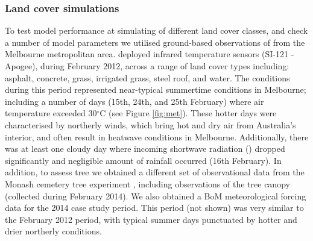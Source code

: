 \documentclass[final,3p,times,authoryear]{elsarticle}
\newcommand{\degreeC}{\ensuremath{^\circ}C }
\begin{document}
\subsubsection{Land cover simulations}\label{sec:landcoversim} 

To test model performance at simulating  of different land cover classes, and check a number of model parameters we utilised ground-based observations of  from the Melbourne metropolitan area. \cite{Coutts2016a} deployed infrared temperature sensors (SI-121 - Apogee), during February 2012, across a range of land cover types including: asphalt, concrete, grass, irrigated grass, steel roof, and water. The conditions during this period represented near-typical summertime conditions in Melbourne; including a number of days (15th, 24th, and 25th February) where air temperature exceeded 30\degreeC (see Figure \ref{fig:met}). These hotter days were characterised by northerly winds, which bring hot and dry air from Australia's interior, and often result in heatwave conditions in Melbourne. Additionally, there was at least one cloudy day where incoming shortwave radiation () dropped significantly and negligible amount of rainfall occurred (16th February).  In addition, to assess tree  we obtained a different set of observational data from the Monash cemetery tree experiment \citep{Coutts2016b}, including  observations of the tree canopy (collected during February 2014). We also obtained a BoM meteorological forcing data for the 2014 case study period.  This period (not shown) was very similar to the February 2012 period, with typical summer days punctuated by hotter and drier northerly conditions. 
\end{document}
